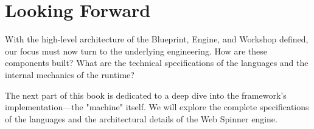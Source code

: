 \section{Looking Forward}
\label{sec:architecture-forward}

With the high-level architecture of the Blueprint, Engine, and Workshop defined, our focus must now turn to the underlying engineering. How are these components built? What are the technical specifications of the languages and the internal mechanics of the runtime?

The next part of this book is dedicated to a deep dive into the framework's implementation—the "machine" itself. We will explore the complete specifications of the languages and the architectural details of the Web Spinner engine.
